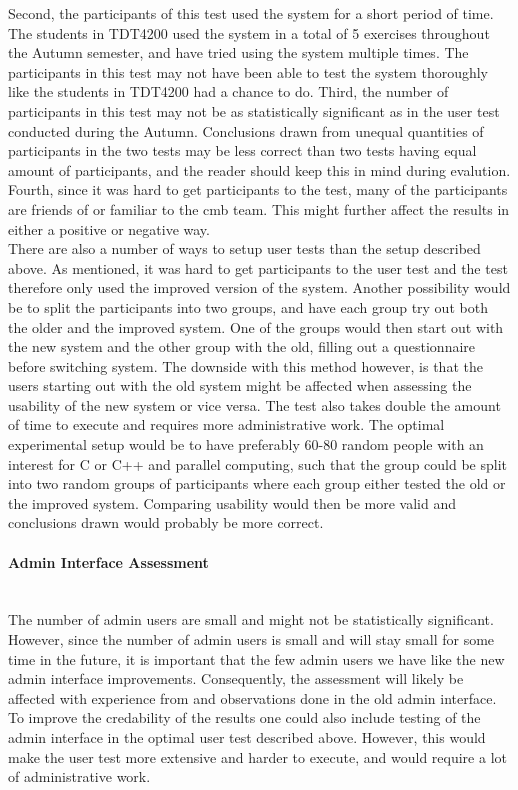 Second, the participants of this test used the system for a short period of time. The students in TDT4200 used the system in a total of 5 exercises throughout the Autumn semester, and have tried using the system multiple times. The participants in this test may not have been able to test the system thoroughly like the students in TDT4200 had a chance to do. Third, the number of participants in this test may not be as statistically significant as in the user test conducted during the Autumn. Conclusions drawn from unequal quantities of participants in the two tests may be less correct than two tests having equal amount of participants, and the reader should keep this in mind during evalution. Fourth, since it was hard to get participants to the test, many of the participants are friends of or familiar to the \gls{cmb} team. This might further affect the results in either a positive or negative way. \\

There are also a number of ways to setup user tests than the setup described above. As mentioned, it was hard to get participants to the user test and the test therefore only used the improved version of the system. Another possibility would be to split the participants into two groups, and have each group try out both the older and the improved system. One of the groups would then start out with the new system and the other group with the old, filling out a questionnaire before switching system. The downside with this method however, is that the users starting out with the old system might be affected when assessing the usability of the new system or vice versa. The test also takes double the amount of time to execute and requires more administrative work. The optimal experimental setup would be to have preferably 60-80 random people with an interest for C or C++ and parallel computing, such that the group could be split into two random groups of participants where each group either tested the old or the improved system. Comparing usability would then be more valid and conclusions drawn would probably be more correct.

\paragraph*{Admin Interface Assessment} \hfill \\
The number of admin users are small and might not be statistically significant. However, since the number of admin users is small and will stay small for some time in the future, it is important that the few admin users we have like the new admin interface improvements. Consequently, the assessment will likely be affected with experience from and observations done in the old admin interface. To improve the credability of the results one could also include testing of the admin interface in the optimal user test described above. However, this would make the user test more extensive and harder to execute, and would require a lot of administrative work.


